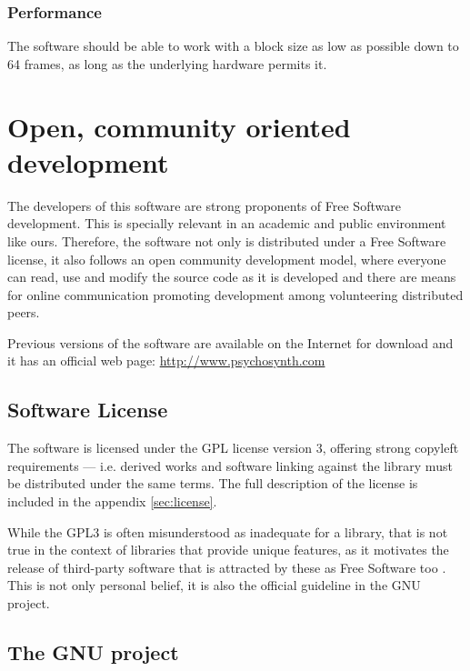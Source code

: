 \subsubsection{Performance}

\begin{requirement}[Latency]
  The software should be able to work with a block size as low as
  possible down to 64 frames, as long as the underlying hardware
  permits it.
\end{requirement}

\section{Open, community oriented development}

The developers of this software are strong proponents of Free Software
development. This is specially relevant in an academic and public
environment like ours. Therefore, the software not only is distributed
under a Free Software license, it also follows an open community
development model, where everyone can read, use and modify the
source code as it is developed and there are means for online
communication promoting development among volunteering distributed
peers.

Previous versions of the software are available on the Internet for
download and it has an official web page:
\url{http://www.psychosynth.com}

\subsection{Software License}

The software is licensed under the GPL license version 3, offering
strong copyleft requirements --- i.e. derived works and software
linking against the library must be distributed under the same
terms. The full description of the license is included in the appendix
\ref{sec:license}.

While the GPL3 is often misunderstood as inadequate for a library,
that is not true in the context of libraries that provide unique
features, as it motivates the release of third-party software that is
attracted by these as Free Software too \cite{gnu99why}. This is not
only personal belief, it is also the official guideline in the GNU
project.

\subsection{The GNU project}

